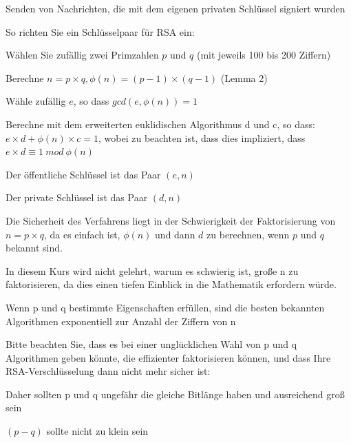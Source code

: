 \documentclass[a4paper]{article}
\begin{document}
\begin{multicols}{3}
\begin{itemize*}
\begin{itemize*}
                  \item Senden von Nachrichten, die mit dem eigenen privaten Schlüssel signiert wurden
            \end{itemize*}
            \item So richten Sie ein Schlüsselpaar für RSA ein:
            \begin{itemize*}
                  \item Wählen Sie zufällig zwei Primzahlen $p$ und $q$ (mit jeweils 100 bis 200 Ziffern)
                  \item Berechne $n=p\times q,\phi(n)=(p-1)\times (q-1)$ (Lemma 2)
                  \item Wähle zufällig $e$, so dass $gcd(e,\phi(n))=1$
                  \item Berechne mit dem erweiterten euklidischen Algorithmus d und c, so dass: $e\times d+\phi(n)\times c = 1$, wobei zu beachten ist, dass dies impliziert, dass $e\times d\equiv 1\ mod\ \phi(n)$
                  \item Der öffentliche Schlüssel ist das Paar $(e, n)$
                  \item Der private Schlüssel ist das Paar $(d, n)$
            \end{itemize*}
            \item Die Sicherheit des Verfahrens liegt in der Schwierigkeit der
            Faktorisierung von $n=p\times q$, da es einfach ist,
            $\phi(n)$ und dann $d$ zu berechnen, wenn $p$ und
            $q$ bekannt sind.
            \item In diesem Kurs wird nicht gelehrt, warum es schwierig ist, große n zu
            faktorisieren, da dies einen tiefen Einblick in die Mathematik
            erfordern würde.
            \begin{itemize*}
                  \item Wenn p und q bestimmte Eigenschaften erfüllen, sind die besten bekannten Algorithmen exponentiell zur Anzahl der Ziffern von n
                  \item Bitte beachten Sie, dass es bei einer unglücklichen Wahl von p und q Algorithmen geben könnte, die effizienter faktorisieren können, und dass Ihre RSA-Verschlüsselung dann nicht mehr sicher ist:
                  \begin{itemize*}
                        \item Daher sollten p und q ungefähr die gleiche Bitlänge haben und ausreichend groß sein
                        \item $(p-q)$ sollte nicht zu klein sein

\end{itemize*}
\end{itemize*}
\end{itemize*}
\end{multicols}
\end{document}
